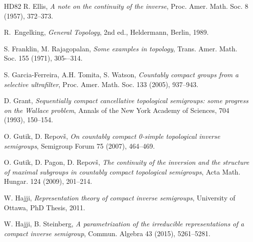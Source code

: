 \documentclass[12pt, twoside, leqno]{article}
\theoremstyle{definition}
\numberwithin{equation}{section}
\begin{document}
\begin{thebibliography}{HD82}
    R. Ellis, {\em A note on the continuity of the inverse}, Proc. Amer. Math.
    Soc.  8 (1957), 372--373.

R.~Engelking, {\em General Topology}, 2nd ed., Heldermann,
Berlin, 1989.


S. Franklin, M. Rajagopalan, {\em Some examples in topology}, Trans. Amer. Math. Soc. 155 (1971), 305-–314.



S. Garcia-Ferreira, A.H. Tomita, S. Watson, {\em Countably compact groups from a selective ultrafilter}, Proc. Amer. Math. Soc. 133 (2005), 937--943. 





D. Grant, {\em Sequentially compact cancellative topological semigroups: some progress on the Wallace problem}, Annals of the New York Academy of Sciences, 704 (1993), 150--154.



O. Gutik, D. Repov\v{s}, {\em On countably compact 0-simple topological inverse semigroups}, Semigroup Forum 75 (2007), 464--469.




O. Gutik, D. Pagon, D. Repov\v{s}, {\em The continuity of the inversion and the structure of maximal subgroups in countably compact topological semigroups},
Acta Math. Hungar. 124 (2009), 201--214.


W. Hajji, {\em Representation theory of compact inverse semigroups}, University of Ottawa, PhD Thesis, 2011.


W. Hajji, B. Steinberg, {\em A parametrization of the irreducible representations of a compact inverse semigroup}, Commun. Algebra 43 (2015), 5261--5281.


\end{thebibliography}
\end{document}
